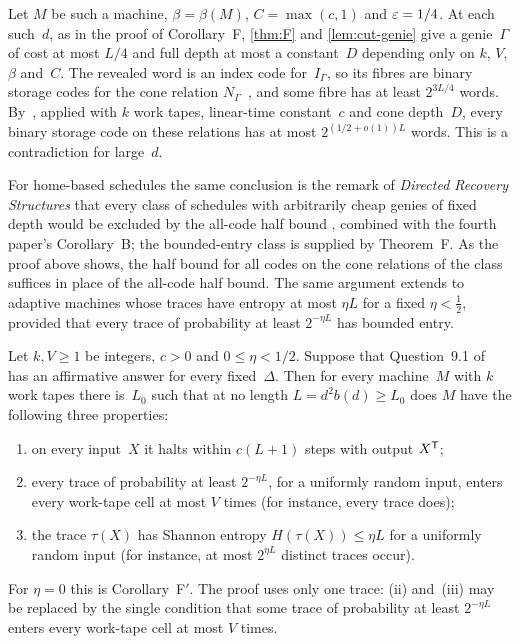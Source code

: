 \begin{informalproof}
Let $M$ be such a machine, $\beta=\beta(M)$, $C=\max(c,1)$ and $\varepsilon=1/4$. At each such~$d$, as in the proof of
Corollary~F, \cref{thm:F} and \cref{lem:cut-genie} give a genie~$\Gamma$ of cost at most $L/4$ and full depth at most a
constant~$D$ depending only on $k$, $V$, $\beta$ and~$C$. The revealed word is an index code for~$I_\Gamma$, so its fibres
are binary storage codes for the cone relation $N_\Gamma$~\cite[Remark~4.9(b)]{FourthPaper2026}, and some fibre has at least
$2^{3L/4}$ words. By~\cite[Proposition~9.2]{DirectedRecovery2026}, applied with $k$ work tapes, linear-time constant~$c$ and
cone depth~$D$, every binary storage code on these relations has at most $2^{(1/2+o(1))L}$ words. This is a contradiction
for large~$d$.
\end{informalproof}

For home-based schedules the same conclusion is the remark of \emph{Directed Recovery Structures} that every class of
schedules with arbitrarily cheap genies of fixed depth would be excluded by the all-code half bound
\cite[Section~9.1]{DirectedRecovery2026}, combined with the fourth paper's Corollary~B; the bounded-entry class is supplied by
Theorem~F. As the proof above shows, the half bound for all codes on the cone relations of the class suffices in place of
the all-code half bound. The same argument extends to adaptive machines whose traces have entropy at most $\eta L$ for a fixed
$\eta<\frac12$, provided that every trace of probability at least $2^{-\eta L}$ has bounded entry.

\begin{corollary}\label{cor:Fsecond}
\notformalized
Let $k,V\ge1$ be integers, $c>0$ and $0\le\eta<1/2$. Suppose that Question~9.1 of~\cite{DirectedRecovery2026} has an
affirmative answer for every fixed~$\Delta$. Then for every machine~$M$ with $k$ work tapes there is~$L_0$ such that at no
length $L=d^2b(d)\ge L_0$ does $M$ have the following three properties:
\begin{enumerate}[label=(\roman*)]
\item on every input~$X$ it halts within $c(L+1)$ steps with output $X^{\mathsf{T}}$;
\item every trace of probability at least $2^{-\eta L}$, for a uniformly random input, enters every work-tape cell at most
$V$ times (for instance, every trace does);
\item the trace $\tau(X)$ has Shannon entropy $H(\tau(X))\le\eta L$ for a uniformly random input (for instance, at most
$2^{\eta L}$ distinct traces occur).
\end{enumerate}
For $\eta=0$ this is Corollary~F$'$. The proof uses only one trace: (ii) and~(iii) may be replaced by the single condition
that some trace of probability at least $2^{-\eta L}$ enters every work-tape cell at most $V$ times.
\end{corollary}

